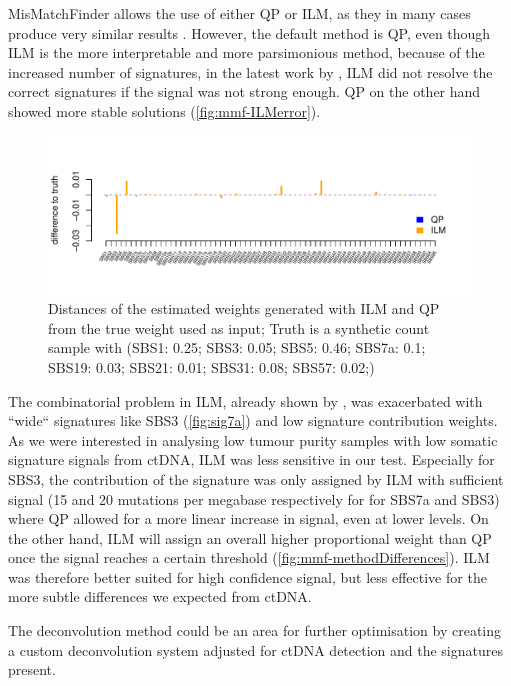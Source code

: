 MisMatchFinder allows the use of either QP or ILM, as they in many cases produce very similar results \cite{Lynch2016}. However, the default method is QP, even though ILM is the more interpretable and  more parsimonious method, because of the increased number of signatures, in the latest work by \textcite{Alexandrov2020}, ILM did not resolve the correct signatures if the signal was not strong enough. QP on the other hand showed more stable solutions (\autoref{fig:mmf-ILMerror}).

\begin{figure}[!ht]
\centering
\includegraphics[width=.99\linewidth]{Figures/MisMatchFinder/lowInputSignalDeconv.pdf}
\caption[Distance of deconvolution methods from truth]{Distances of the estimated weights generated with ILM and QP from the true weight used as input; Truth is a synthetic count sample with (SBS1: 0.25; SBS3: 0.05; SBS5: 0.46; SBS7a: 0.1; SBS19: 0.03; SBS21: 0.01; SBS31: 0.08; SBS57: 0.02;)}\label{fig:mmf-ILMerror}
\end{figure}
 
The combinatorial problem in ILM, already shown by \textcite{Lynch2016}, was exacerbated  with ``wide`` signatures like SBS3 (\autoref{fig:sig7a}) and low signature contribution weights. As we were interested in analysing low tumour purity samples with low somatic signature signals from ctDNA, ILM was less sensitive in our test. Especially for SBS3, the contribution of the signature was only assigned by ILM with sufficient signal (15 and 20 mutations per megabase respectively for for SBS7a and SBS3) where QP allowed for a more linear increase in signal, even at lower levels. On the other hand, ILM will assign an overall higher proportional weight than QP once the signal reaches a certain threshold (\autoref{fig:mmf-methodDifferences}). ILM was therefore better suited for high confidence signal, but less effective for the more subtle differences we expected from ctDNA.

The deconvolution method could be an area for further optimisation by creating a custom deconvolution system adjusted for ctDNA detection and the signatures present.

